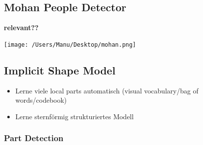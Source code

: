 \documentclass[paper=a4, fontsize=11pt]{scrartcl} %
\numberwithin{equation}{section} %
\numberwithin{figure}{section} %
\numberwithin{table}{section} %
\begin{document}
\subsection{Mohan People Detector}

\textbf{relevant??}

\texttt{[image: /Users/Manu/Desktop/mohan.png]}

\subsection{Implicit Shape Model}

\begin{itemize}
\item Lerne viele local parts automatisch (visual vocabulary/bag of words/codebook)
\item Lerne sternförmig strukturiertes Modell 
\end{itemize}

\subsubsection{Part Detection}
\end{document}

